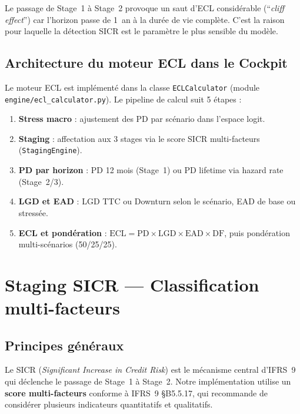 \documentclass[12pt,a4paper]{article}
\begin{document}
\begin{interpretbox}
Le passage de Stage~1 \`a Stage~2 provoque un saut d'ECL consid\'erable (``\textit{cliff effect}'') car l'horizon passe de 1~an \`a la dur\'ee de vie compl\`ete. C'est la raison pour laquelle la d\'etection SICR est le param\`etre le plus sensible du mod\`ele.
\end{interpretbox}

\subsection{Architecture du moteur ECL dans le Cockpit}

Le moteur ECL est impl\'ement\'e dans la classe \texttt{ECLCalculator} (module \texttt{engine/ecl\_calculator.py}). Le pipeline de calcul suit 5 \'etapes :

\begin{enumerate}
    \item \textbf{Stress macro} : ajustement des PD par sc\'enario dans l'espace logit.
    \item \textbf{Staging} : affectation aux 3 stages via le score SICR multi-facteurs (\texttt{StagingEngine}).
    \item \textbf{PD par horizon} : PD 12 mois (Stage~1) ou PD lifetime via hazard rate (Stage~2/3).
    \item \textbf{LGD et EAD} : LGD TTC ou Downturn selon le sc\'enario, EAD de base ou stress\'ee.
    \item \textbf{ECL et pond\'eration} : $\text{ECL} = \text{PD} \times \text{LGD} \times \text{EAD} \times \text{DF}$, puis pond\'eration multi-sc\'enarios (50/25/25).
\end{enumerate}

\newpage
\section{Staging SICR --- Classification multi-facteurs}
\label{sec:staging}

\subsection{Principes g\'en\'eraux}

Le SICR (\textit{Significant Increase in Credit Risk}) est le m\'ecanisme central d'IFRS~9 qui d\'eclenche le passage de Stage~1 \`a Stage~2. Notre impl\'ementation utilise un \textbf{score multi-facteurs} conforme \`a IFRS~9 \S B5.5.17, qui recommande de consid\'erer plusieurs indicateurs quantitatifs et qualitatifs.
\end{document}

